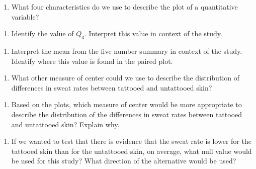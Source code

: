 \documentclass[
]{report}
\providecommand{\tightlist}{%
  \setlength{\itemsep}{0pt}\setlength{\parskip}{0pt}}
\begin{document}
\begin{enumerate}
\def\labelenumi{\arabic{enumi}.}
\setcounter{enumi}{10}
\tightlist
\item
  What four characteristics do we use to describe the plot of a quantitative variable?
\end{enumerate}

\vspace{0.6in}

\begin{enumerate}
\def\labelenumi{\arabic{enumi}.}
\setcounter{enumi}{11}
\tightlist
\item
  Identify the value of \(Q_3\). Interpret this value in context of the study.
\end{enumerate}

\vspace{0.8in}

\begin{enumerate}
\def\labelenumi{\arabic{enumi}.}
\setcounter{enumi}{12}
\tightlist
\item
  Interpret the mean from the five number summary in context of the study. Identify where this value is found in the paired plot.
\end{enumerate}

\vspace{0.6in}

\begin{enumerate}
\def\labelenumi{\arabic{enumi}.}
\setcounter{enumi}{13}
\tightlist
\item
  What other measure of center could we use to describe the distribution of differences in sweat rates between tattooed and untattooed skin?
\end{enumerate}

\vspace{0.2in}

\begin{enumerate}
\def\labelenumi{\arabic{enumi}.}
\setcounter{enumi}{14}
\tightlist
\item
  Based on the plots, which measure of center would be more appropriate to describe the distribution of the differences in sweat rates between tattooed and untattooed skin? Explain why.
\end{enumerate}

\vspace{0.5in}

\begin{enumerate}
\def\labelenumi{\arabic{enumi}.}
\setcounter{enumi}{15}
\tightlist
\item
  If we wanted to test that there is evidence that the sweat rate is lower for the tattooed skin than for the untattooed skin, on average, what null value would be used for this study? What direction of the alternative would be used?
\end{enumerate}
\end{document}
